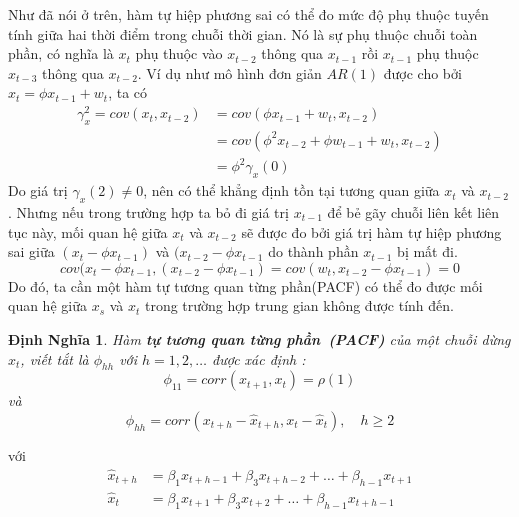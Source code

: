 \documentclass[twoside,12pt]{Latex/Classes/PhDthesisPSnPDF}
\newtheorem{defi}{Định Nghĩa}[chapter]
\begin{document}
Như đã nói ở trên, hàm tự hiệp phương sai có thể đo mức độ phụ thuộc tuyến tính giữa hai thời điểm trong chuỗi thời gian. Nó là sự phụ thuộc chuỗi toàn phần, có nghĩa là $x_t$ phụ thuộc vào $x_{t-2}$ thông qua $x_{t-1}$ rồi $x_{t-1}$ phụ thuộc $x_{t-3}$ thông qua $x_{t-2}$. Ví dụ như mô hình đơn giản $AR(1)$ được cho bởi $x_t = \phi x_{t-1}+w_t$, ta có
\begin{align}
	\gamma_x^2 = cov(x_t,x_{t-2}) &= cov(\phi x_{t-1}+w_t,x_{t-2})\\
	&= cov(\phi^2x_{t-2}+\phi w_{t-1}+w_t,x_{t-2}) \\
	&= \phi^2\gamma_x(0)
\end{align} 
Do giá trị $\gamma_x(2) \neq 0$, nên có thể khẳng định tồn tại tương quan giữa $x_t$ và $x_{t-2}$. Nhưng nếu trong trường hợp ta bỏ đi giá trị $x_{t-1}$ để bẻ gãy chuỗi liên kết liên tục này, mối quan hệ giữa $x_t$ và $x_{t-2}$ sẽ được đo bởi giá trị hàm tự hiệp phương sai giữa $(x_t-\phi x_{t-1})$ và $(x_{t-2}-\phi x_{t-1}$ do thành phần $x_{t-1}$ bị mất đi.
\begin{equation}
	cov(x_t-\phi x_{t-1},(x_{t-2}-\phi x_{t-1}) = cov (w_t,x_{t-2}-\phi x_{t-1}) = 0
\end{equation}
Do đó, ta cần một hàm tự tương quan từng phần(PACF) có thể đo được mối quan hệ giữa $x_s$ và $x_t$ trong trường hợp trung gian không được tính đến.

\begin{defi}
	Hàm \textbf{tự tương quan từng phần~(PACF)} của một chuỗi dừng $x_t$, viết tắt là $\phi_{hh}$ với $h=1,2,\dots$ được xác định :
	\begin{equation}
		\phi_{11} = corr(x_{t+1},x_t) = \rho(1)	
	\end{equation}
	 và
	 \begin{equation}
	 	\phi_{hh} = corr(x_{t+h}-\hat{x}_{t+h},x_{t}-\hat{x}_{t}),\quad h \geq 2
	 \end{equation}
\end{defi}
với 
\begin{align}
	\hat{x}_{t+h} &= \beta_{1}x_{t+h-1}+\beta_{3}x_{t+h-2}+\dots+\beta_{h-1}x_{t+1}\\
	\hat{x}_{t} &= \beta_{1}x_{t+1}+\beta_{3}x_{t+2}+\dots+\beta_{h-1}x_{t+h-1}	\label{hatx}
\end{align}
\end{document}
